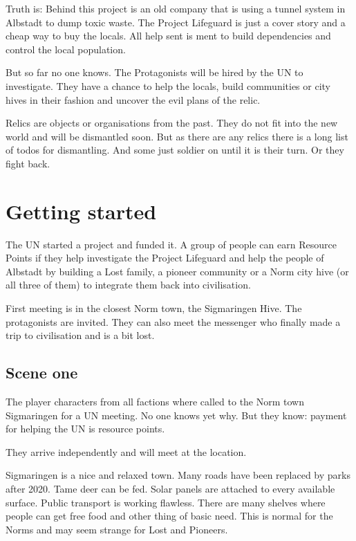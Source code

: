 Truth is: Behind this project is an old company that is using a tunnel system in Albstadt to dump toxic waste. The Project Lifeguard is just a  cover story and a cheap way to buy the locals. All help sent is ment to build dependencies and control the local population.

But so far no one knows. The Protagonists will be hired by the UN to investigate. They have a chance to help the locals, build communities or city hives in their fashion and uncover the evil plans of the relic.

\begin{sidebarBox}[title=Relics]
Relics are objects or organisations from the past. They do not fit into the new world and will be dismantled soon. But as there are any relics there is a long list of todos for dismantling. And some just soldier on until it is their turn. Or they fight back.
\end{sidebarBox}

\section{Getting started}

The UN started a project and funded it. A group of people can earn Resource Points if they help investigate the Project Lifeguard and help the people of Albstadt by building a Lost family, a pioneer community or a Norm city hive (or all three of them) to integrate them back into civilisation.

First meeting is in the closest Norm town, the Sigmaringen Hive. The protagonists are invited. They can also meet the messenger who finally made a trip to civilisation and is a bit lost.

\subsection{Scene one}

The player characters from all factions where called to the Norm town Sigmaringen for a UN meeting. No one knows yet why. But they know: payment for helping the UN is resource points.

They arrive independently and will meet at the location.

Sigmaringen is a nice and relaxed town. Many roads have been replaced by parks after 2020. Tame deer can be fed. Solar panels are attached to every available surface. Public transport is working flawless. There are many shelves where people can get free food and other thing of basic need. This is normal for the Norms and may seem strange for Lost and Pioneers.

